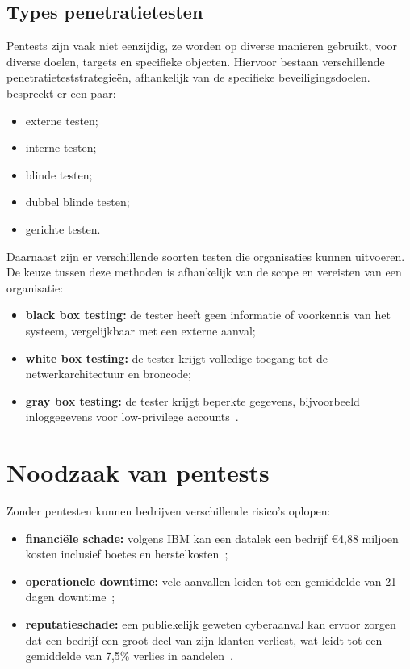 \subsection{Types penetratietesten}
Pentests zijn vaak niet eenzijdig, ze worden op diverse manieren gebruikt, voor diverse doelen, targets en specifieke objecten.
Hiervoor bestaan verschillende penetratieteststrategieën, afhankelijk van de specifieke beveiligingsdoelen.~\textcite{Vats2020} bespreekt er een paar: %

\begin{itemize}
    \item externe testen;
    \item interne testen;
    \item blinde testen;
    \item dubbel blinde testen;
    \item gerichte testen.
\end{itemize}

Daarnaast zijn er verschillende soorten testen die organisaties kunnen uitvoeren. De keuze tussen deze methoden is afhankelijk van de scope en vereisten van een organisatie:

\begin{itemize}
    \item \textbf{black box testing:} de tester heeft geen informatie of voorkennis van het systeem, vergelijkbaar met een externe aanval;
    \item \textbf{white box testing:} de tester krijgt volledige toegang tot de netwerkarchitectuur en broncode;
    \item \textbf{gray box testing:} de tester krijgt beperkte gegevens, bijvoorbeeld inloggegevens voor low-privilege accounts~\autocite{Khamdamovich2021}.
\end{itemize}


\section{Noodzaak van pentests}
Zonder pentesten kunnen bedrijven verschillende risico's oplopen:

\begin{itemize}
    \item \textbf{financiële schade:} volgens IBM kan een datalek een bedrijf €4,88 miljoen kosten inclusief boetes en herstelkosten~\autocite{IBM2024};
    \item \textbf{operationele downtime:} vele aanvallen leiden tot een gemiddelde van 21 dagen downtime~\autocite{DBIR2023};
    \item \textbf{reputatieschade:} een publiekelijk geweten cyberaanval kan ervoor zorgen dat een bedrijf een groot deel van zijn klanten verliest, wat leidt tot een gemiddelde van 7,5\% verlies in aandelen~\autocite{Ponemon2022,keman2023}.
\end{itemize}

